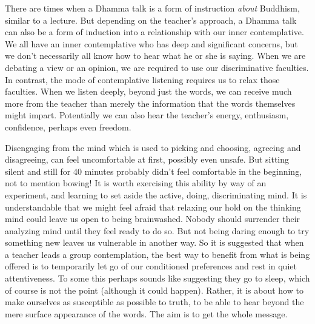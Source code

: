 There are times when a Dhamma talk is a form of instruction \emph{about}
Buddhism, similar to a lecture. But depending on the teacher’s approach,
a Dhamma talk can also be a form of induction into a relationship with
our inner contemplative. We all have an inner contemplative who has deep
and significant concerns, but we don’t necessarily all know how to hear
what he or she is saying. When we are debating a view or an opinion, we
are required to use our discriminative faculties. In contrast, the mode
of contemplative listening requires us to relax those faculties. When we
listen deeply, beyond just the words, we can receive much more from the
teacher than merely the information that the words themselves might
impart. Potentially we can also hear the teacher’s energy, enthusiasm,
confidence, perhaps even freedom.

Disengaging from the mind which is used to picking and choosing,
agreeing and disagreeing, can feel uncomfortable at first, possibly even
unsafe. But sitting silent and still for 40 minutes probably didn’t feel
comfortable in the beginning, not to mention bowing! It is worth
exercising this ability by way of an experiment, and learning to set
aside the active, doing, discriminating mind. It is understandable that
we might feel afraid that relaxing our hold on the thinking mind could
leave us open to being brainwashed. Nobody should surrender their
analyzing mind until they feel ready to do so. But not being daring
enough to try something new leaves us vulnerable in another way. So it
is suggested that when a teacher leads a group contemplation, the best
way to benefit from what is being offered is to temporarily let go of
our conditioned preferences and rest in quiet attentiveness. To some
this perhaps sounds like suggesting they go to sleep, which of course is
not the point (although it could happen). Rather, it is about how to
make ourselves as susceptible as possible to truth, to be able to hear
beyond the mere surface appearance of the words. The aim is to get the
whole message.

